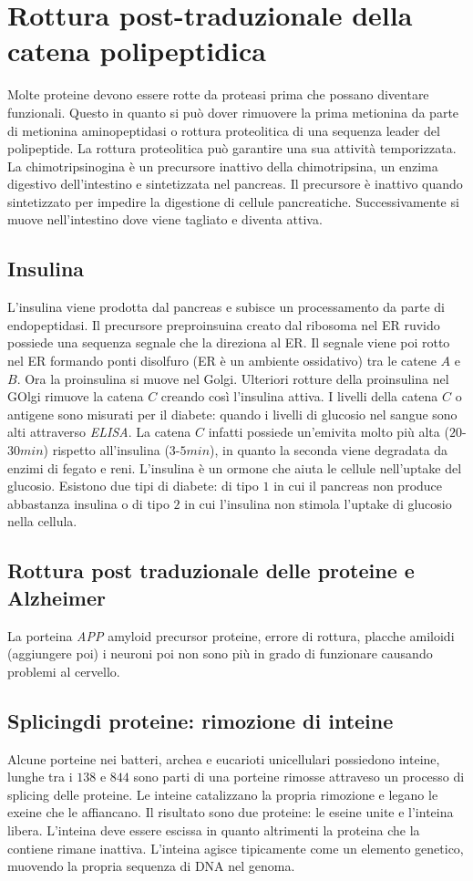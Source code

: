 \section{Rottura post-traduzionale della catena polipeptidica}
Molte proteine devono essere rotte da proteasi prima che possano diventare funzionali. Questo in quanto si pu\`o dover rimuovere la prima metionina da parte di metionina aminopeptidasi o rottura proteolitica di una sequenza 
leader del polipeptide. La rottura proteolitica pu\`o garantire una sua attivit\`a temporizzata. La chimotripsinogina \`e un precursore inattivo della chimotripsina, un enzima digestivo dell'intestino e sintetizzata nel 
pancreas. Il precursore \`e inattivo quando sintetizzato per impedire la digestione di cellule pancreatiche. Successivamente si muove nell'intestino dove viene tagliato e diventa attiva. 
\subsection{Insulina}
L'insulina viene prodotta dal pancreas e subisce un processamento da parte di endopeptidasi. Il precursore preproinsuina creato dal ribosoma nel ER ruvido possiede una sequenza segnale che la direziona al ER. Il segnale
viene poi rotto nel ER formando ponti disolfuro (ER \`e un ambiente ossidativo) tra le catene $A$ e $B$. Ora la proinsulina si muove nel Golgi. Ulteriori rotture della proinsulina nel GOlgi rimuove la catena $C$ creando
cos\`i l'insulina attiva. I livelli della catena $C$ o antigene sono misurati per il diabete: quando i livelli di glucosio nel sangue sono alti attraverso \emph{ELISA}. La catena $C$ infatti possiede un'emivita molto pi\`u
alta ($20$-$30min$) rispetto all'insulina ($3$-$5min$), in quanto la seconda viene degradata da enzimi di fegato e reni. L'insulina \`e un ormone che aiuta le cellule nell'uptake del glucosio. Esistono due tipi di diabete:
di tipo $1$ in cui il pancreas non produce abbastanza insulina o di tipo $2$ in cui l'insulina non stimola l'uptake di glucosio nella cellula. 
\subsection{Rottura post traduzionale delle proteine e Alzheimer}
La porteina \emph{APP} amyloid precursor proteine, errore di rottura, placche amiloidi (aggiungere poi) 
i neuroni poi non sono pi\`u in grado di funzionare causando problemi al cervello. 
\subsection{Splicingdi proteine: rimozione di inteine}
Alcune porteine nei batteri, archea e eucarioti unicellulari possiedono inteine, lunghe tra i $138$ e $844$ sono parti di una porteine rimosse attraveso un processo di splicing delle proteine. Le inteine catalizzano la 
propria rimozione e legano le exeine che le affiancano. Il risultato sono due proteine: le eseine unite e l'inteina libera. L'inteina deve essere escissa in quanto altrimenti la proteina che la contiene rimane inattiva. 
L'inteina agisce tipicamente come un elemento genetico, muovendo la propria sequenza di DNA nel genoma. 
